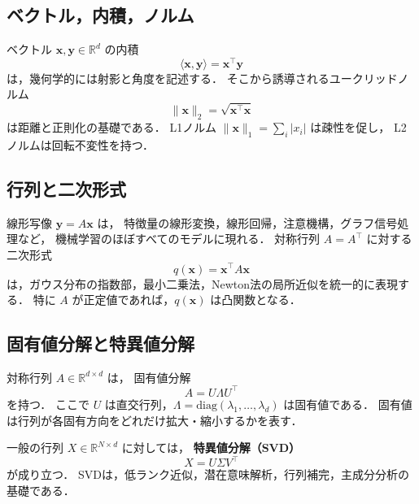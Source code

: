 \subsection{ベクトル，内積，ノルム}

ベクトル $\boldsymbol{x},\boldsymbol{y}\in\mathbb{R}^{d}$ の内積
\begin{equation}
  \langle \boldsymbol{x}, \boldsymbol{y}\rangle
  =
  \boldsymbol{x}^{\top}\boldsymbol{y}
  \label{eq:inner-product}
\end{equation}
は，幾何学的には射影と角度を記述する．
そこから誘導されるユークリッドノルム
\begin{equation}
  \|\boldsymbol{x}\|_{2}
  =
  \sqrt{\boldsymbol{x}^{\top}\boldsymbol{x}}
  \label{eq:l2norm}
\end{equation}
は距離と正則化の基礎である．
L1ノルム $\|\boldsymbol{x}\|_{1} = \sum_{i}|x_{i}|$ は疎性を促し，
L2ノルムは回転不変性を持つ．

\subsection{行列と二次形式}

線形写像 $\boldsymbol{y} = A\boldsymbol{x}$ は，
特徴量の線形変換，線形回帰，注意機構，グラフ信号処理など，
機械学習のほぼすべてのモデルに現れる．
対称行列 $A=A^{\top}$ に対する二次形式
\begin{equation}
  q(\boldsymbol{x}) = \boldsymbol{x}^{\top}A\boldsymbol{x}
  \label{eq:quadratic-form}
\end{equation}
は，ガウス分布の指数部，最小二乗法，Newton法の局所近似を統一的に表現する．
特に $A$ が正定値であれば，$q(\boldsymbol{x})$ は凸関数となる．

\subsection{固有値分解と特異値分解}

対称行列 $A\in\mathbb{R}^{d\times d}$ は，
固有値分解
\begin{equation}
  A = U\Lambda U^{\top}
  \label{eq:eigendecomposition}
\end{equation}
を持つ．
ここで $U$ は直交行列，$\Lambda = \mathrm{diag}(\lambda_{1},\ldots,\lambda_{d})$ は固有値である．
固有値は行列が各固有方向をどれだけ拡大・縮小するかを表す．

一般の行列 $X\in\mathbb{R}^{N\times d}$ に対しては，
\textbf{特異値分解（SVD）}
\begin{equation}
  X = U\Sigma V^{\top}
  \label{eq:svd}
\end{equation}
が成り立つ．
SVDは，低ランク近似，潜在意味解析，行列補完，主成分分析の基礎である．

